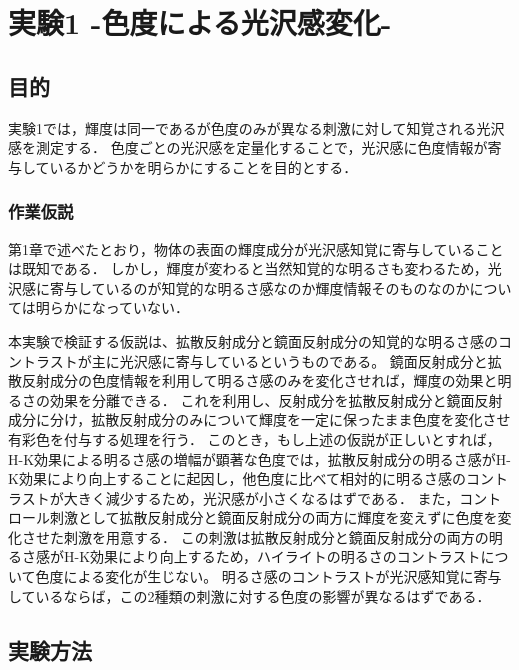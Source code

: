 \chapter{実験1 -色度による光沢感変化-}

    \section{目的}
        実験1では，輝度は同一であるが色度のみが異なる刺激に対して知覚される光沢感を測定する．
        色度ごとの光沢感を定量化することで，光沢感に色度情報が寄与しているかどうかを明らかにすることを目的とする．

        \subsection{作業仮説}
            第1章で述べたとおり，物体の表面の輝度成分が光沢感知覚に寄与していることは既知である．
            しかし，輝度が変わると当然知覚的な明るさも変わるため，光沢感に寄与しているのが知覚的な明るさ感なのか輝度情報そのものなのかについては明らかになっていない．

            本実験で検証する仮説は、拡散反射成分と鏡面反射成分の知覚的な明るさ感のコントラストが主に光沢感に寄与しているというものである。
            鏡面反射成分と拡散反射成分の色度情報を利用して明るさ感のみを変化させれば，輝度の効果と明るさの効果を分離できる．
            これを利用し、反射成分を拡散反射成分と鏡面反射成分に分け，拡散反射成分のみについて輝度を一定に保ったまま色度を変化させ有彩色を付与する処理を行う．
            このとき，もし上述の仮説が正しいとすれば，H-K効果による明るさ感の増幅が顕著な色度では，拡散反射成分の明るさ感がH-K効果により向上することに起因し，他色度に比べて相対的に明るさ感のコントラストが大きく減少するため，光沢感が小さくなるはずである．
            また，コントロール刺激として拡散反射成分と鏡面反射成分の両方に輝度を変えずに色度を変化させた刺激を用意する．
            この刺激は拡散反射成分と鏡面反射成分の両方の明るさ感がH-K効果により向上するため，ハイライトの明るさのコントラストについて色度による変化が生じない。
            明るさ感のコントラストが光沢感知覚に寄与しているならば，この2種類の刺激に対する色度の影響が異なるはずである．

    \section{実験方法}
